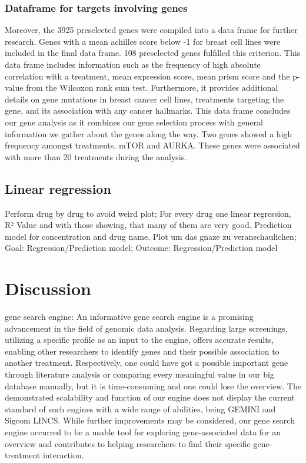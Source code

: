 \documentclass[
  11pt,
]{article}
\begin{document}
\hypertarget{dataframe-for-targets-involving-genes}{%
\subsubsection{Dataframe for targets involving
genes}\label{dataframe-for-targets-involving-genes}}

Moreover, the 3925 preselected genes were compiled into a data frame for
further research. Genes with a mean achilles score below -1 for breast
cell lines were included in the final data frame. 108 preselected genes
fulfilled this criterion. This data frame includes information such as
the frequency of high absolute correlation with a treatment, mean
expression score, mean prism score and the p-value from the Wilcoxon
rank sum test. Furthermore, it provides additional details on gene
mutations in breast cancer cell lines, treatments targeting the gene,
and its association with any cancer hallmarks. This data frame concludes
our gene analysis as it combines our gene selection process with general
information we gather about the genes along the way. Two genes showed a
high frequency amongst treatments, mTOR and AURKA. These genes were
associated with more than 20 treatments during the analysis.

\hypertarget{linear-regression}{%
\subsection{Linear regression}\label{linear-regression}}

Perform drug by drug to avoid weird plot; For every drug one linear
regression, R² Value and with those showing, that many of them are very
good. Prediction model for concentration and drug name. Plot um das
gnaze zu veranschaulichen; Goal: Regression/Prediction model; Outcome:
Regression/Prediction model

\hypertarget{discussion}{%
\section{Discussion}\label{discussion}}

gene search engine: An informative gene search engine is a promising
advancement in the field of genomic data analysis. Regarding large
screenings, utilizing a specific profile as an input to the engine,
offers accurate results, enabling other researchers to identify genes
and their possible association to another treatment. Respectively, one
could have got a possible important gene through literature analysis or
comparing every meaningful value in our big database manually, but it is
time-consuming and one could lose the overview. The demonstrated
scalability and function of our engine does not display the current
standard of such engines with a wide range of abilities, being GEMINI
and Sigcom LINCS. While further improvements may be considered, our gene
search engine occurred to be a usable tool for exploring gene-associated
data for an overview and contributes to helping researchers to find
their specific gene-treatment interaction.
\end{document}
